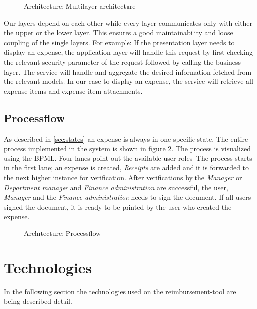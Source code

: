 \begin{figure}[H]
    \centering
    \caption{Architecture: Multilayer architecture}
    \label{fig:architecture-layer}
\end{figure}

Our layers depend on each other while every layer communicates only with either the upper or the lower layer. This ensures a good maintainability and loose coupling of the single layers.\newline 
For example: If the presentation layer needs to display an expense, the application layer will handle this request by first checking the relevant security parameter of the request followed by calling the business layer. The service will handle and aggregate the desired information fetched from the relevant models. In our case to display an expense, the service will retrieve all expense-items and expense-item-attachments.


\subsection{Processflow}
\label{sec:processflow}
As described in \ref{sec:states} an expense is always in one specific state. The entire process implemented in the system is shown in figure \ref{fig:process-diagram}. The process is visualized using the BPML. Four lanes point out the available user roles. The process starts in the first lane; an expense is created, \textit{Receipts} are added and it is forwarded to the next higher instance for verification. After verifications by the \textit{Manager} or \textit{Department manager} and \textit{Finance administration} are successful, the user, \textit{Manager} and the \textit{Finance administration} needs to sign the document. If all users signed the document, it is ready to be printed by the user who created the expense.

\begin{figure}[H]
    \centering
    \caption{Architecture: Processflow}
    \label{fig:process-diagram}
\end{figure}


\section{Technologies}

In the following section the technologies used on the reimbursement-tool are being described detail.

